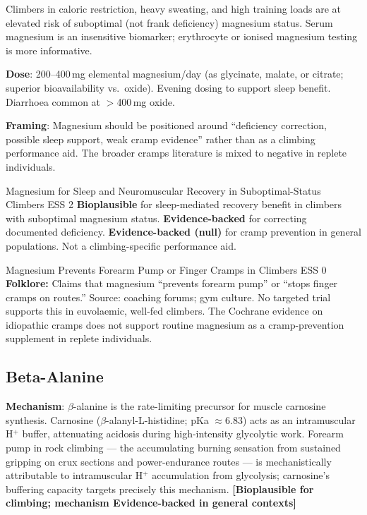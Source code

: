 Climbers in caloric restriction, heavy sweating, and high training loads are at elevated risk of suboptimal (not frank deficiency) magnesium status. Serum magnesium is an insensitive biomarker; erythrocyte or ionised magnesium testing is more informative.

\textbf{Dose}: 200--400\,mg elemental magnesium/day (as glycinate, malate, or citrate; superior bioavailability vs.\ oxide). Evening dosing to support sleep benefit. Diarrhoea common at $>$400\,mg oxide.

\textbf{Framing}: Magnesium should be positioned around ``deficiency correction, possible sleep support, weak cramp evidence'' rather than as a climbing performance aid. The broader cramps literature is mixed to negative in replete individuals.

\begin{bioplausbox}{Magnesium for Sleep and Neuromuscular Recovery in Suboptimal-Status Climbers \cdot \bioplausible \cdot ESS 2}
\textbf{Bioplausible} for sleep-mediated recovery benefit in climbers with suboptimal magnesium status. \textbf{Evidence-backed} for correcting documented deficiency. \textbf{Evidence-backed (null)} for cramp prevention in general populations. Not a climbing-specific performance aid.
\end{bioplausbox}

\begin{folklorebox}{Magnesium Prevents Forearm Pump or Finger Cramps in Climbers \cdot \folkloreverified \cdot ESS 0}
\textbf{Folklore:} Claims that magnesium ``prevents forearm pump'' or ``stops finger cramps on routes.'' Source: coaching forums; gym culture. No targeted trial supports this in euvolaemic, well-fed climbers. The Cochrane evidence on idiopathic cramps does not support routine magnesium as a cramp-prevention supplement in replete individuals.
\end{folklorebox}

\subsection{Beta-Alanine}
\label{subsec:betaalanine}

\textbf{Mechanism}: $\beta$-alanine is the rate-limiting precursor for muscle carnosine synthesis. Carnosine ($\beta$-alanyl-L-histidine; pKa ${\approx}$6.83) acts as an intramuscular H$^+$ buffer, attenuating acidosis during high-intensity glycolytic work. Forearm pump in rock climbing --- the accumulating burning sensation from sustained gripping on crux sections and power-endurance routes --- is mechanistically attributable to intramuscular H$^+$ accumulation from glycolysis; carnosine's buffering capacity targets precisely this mechanism. \textbf{[Bioplausible for climbing; mechanism Evidence-backed in general contexts]}

